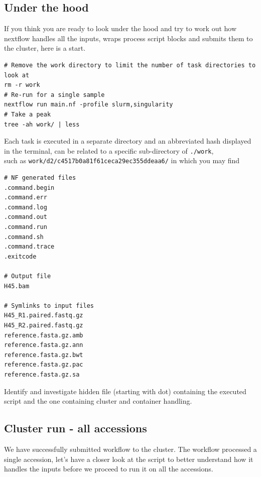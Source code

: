 \subsection{Under the hood}

If you think you are ready to look under the hood and try to work out how nextflow handles all the inputs, wraps process script blocks and submits them to the cluster, here is a start. 

\begin{bonus}
\begin{lstlisting}
# Remove the work directory to limit the number of task directories to look at
rm -r work
# Re-run for a single sample
nextflow run main.nf -profile slurm,singularity
# Take a peak
tree -ah work/ | less
\end{lstlisting}

Each task is executed in a separate directory and an abbreviated hash displayed in the terminal, can be related to a specific sub-directory of \texttt{./work},\\ such as
\texttt{work/d2/c4517b0a81f61ceca29ec355ddeaa6/} in which you may find

\begin{lstlisting}
# NF generated files
.command.begin
.command.err
.command.log
.command.out
.command.run
.command.sh
.command.trace
.exitcode

# Output file
H45.bam

# Symlinks to input files
H45_R1.paired.fastq.gz
H45_R2.paired.fastq.gz
reference.fasta.gz.amb
reference.fasta.gz.ann
reference.fasta.gz.bwt
reference.fasta.gz.pac
reference.fasta.gz.sa
\end{lstlisting}

Identify and investigate hidden file (starting with dot) containing the executed script and the one containing cluster and container handling. 

%
%

\end{bonus}


\subsection{Cluster run - all accessions}

We have successfully submitted workflow to the cluster. 
The workflow processed a single accession, let's have a closer look at the script 
to better understand how it handles the inputs before we proceed to run it on all the accessions.


